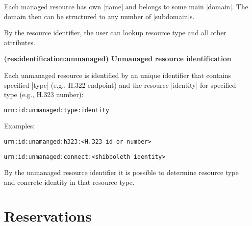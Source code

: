 \documentclass[a4paper]{report}
\makeatletter
\newcounter{UCcounter}
\newenvironment{UseCases}%
	{\begin{list}{\textbf{UC-\arabic{UCcounter}}}{\@nmbrlisttrue\def\@listctr{UCcounter}}}%
	{\end{list}}
\newcommand{\UClabel}[1]{\label{UC:#1}}
\newcommand{\UseCase}[2]{\item\UClabel{#2} \textbf{(#2) #1}\\ \nopagebreak}
\makeatother
\begin{document}
\begin{UseCases}
Each managed resource has own |name| and belongs to some main |domain|. The domain then can be structured to any number of |subdomain|s.

By the resource identifier, the user can lookup resource type and all other attributes.

\UseCase{Unmanaged resource identification}{res:identification:unmanaged}

Each unmanaged resource is identified by an unique identifier that contains specified |type| (e.g., H.322 endpoint) and the resource |identity| for specified type (e.g., H.323 number):
\begin{verbatim}
urn:id:unmanaged:type:identity
\end{verbatim}
Examples: 
\begin{compactitem}
\item \verb|urn:id:unamanged:h323:<H.323 id or number>|
\item \verb|urn:id:unmanaged:connect:<shibboleth identity>|
\end{compactitem}

By the unmanaged resource identifier it is possible to determine resource type and concrete identity in that resource type.

\end{UseCases}


\section{Reservations}
\end{document}
